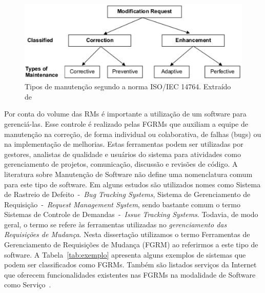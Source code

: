 \begin{figure}[hbtp] \centering \includegraphics[width=.75\textwidth]
	{./chapter-intro/img/modification_request.eps} \caption{Tipos de manutenção
		segundo a norma ISO/IEC 14764. Extraído de~\cite{1703974}}\label{fig:modification-request}
\end{figure}

Por conta do volume das RMs é importante a utilização de um software para
gerenciá-las. Esse controle é realizado pelas FGRMs que auxiliam a equipe de
manutenção na correção, de forma individual ou colaborativa, de falhas (bugs)
ou na implementação de melhorias. Estas ferramentas podem ser utilizadas por
gestores, analistas de qualidade e usuários do sistema para atividades como
gerenciamento de projetos, comunicação, discussão e revisões de código. A
literatura sobre Manutenção de Software não define uma nomenclatura comum para
este tipo de software. Em alguns estudos são utilizados nomes como Sistema de
Rastreio de Defeito~-~\textit{Bug Tracking Systems}, Sistema de Gerenciamento
de Requisição~-~\textit{Request Management System}, sendo bastante comum o
termo Sistemas de Controle de Demandas~-~\textit{Issue Tracking Systems}.
Todavia, de modo geral, o termo se refere às ferramentas utilizadas no
\textit{gerenciamento das Requisições de Mudança}. Nesta dissertação utilizamos
o termo Ferramentas de Gerenciamento de Requisições de Mudança (FGRM) ao
referirmos a este tipo de software. A Tabela~\ref{tab:exemplo} apresenta alguns
exemplos de sistemas que podem ser classificados como FGRMs. Também são
listados serviços da Internet que oferecem funcionalidades existentes nas FGRMs
na modalidade de Software como Serviço~\cite{fox2013engineering}.

